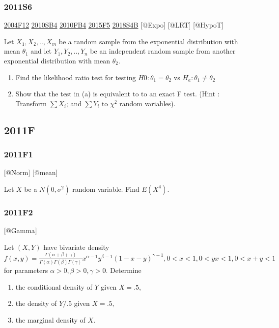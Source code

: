 \documentclass[6pt,Portrait]{article}
\begin{document}
\hypertarget{s6-2}{%
\subsubsection{2011S6}\label{s6-2}}

\protect\hyperlink{f12}{2004F12} \protect\hyperlink{sb4}{2010SB4}
\protect\hyperlink{fb4-1}{2010FB4} \protect\hyperlink{f5-5}{2015F5}
\protect\hyperlink{s4b-2}{2018S4B} {[}@Expo{]} {[}@LRT{]} {[}@HypoT{]}

Let \(X_1,X_2,..,X_{m}\) be a random sample from the exponential
distribution with mean \(\theta_1\) and let \(Y_1,Y_2,..,Y_{n}\) be an
independent random sample from another exponential distribution with
mean \(\theta_2\).

\begin{enumerate}
\def\labelenumi{(\alph{enumi})}
\item
  Find the likelihood ratio test for testing \(H0:\theta_1=\theta_2\) vs
  \(H_a:\theta_1\neq\theta_2\)
\item
  Show that the test in (a) is equivalent to to an exact F test. (Hint :
  Transform \(\sum X_i\); and \(\sum Y_i\) to \(\chi^2\) random
  variables).
\end{enumerate}

\hypertarget{f-7}{%
\subsection{2011F}\label{f-7}}

\hypertarget{f1-4}{%
\subsubsection{2011F1}\label{f1-4}}

{[}@Norm{]} {[}@mean{]}

Let \(X\) be a \(N(0,\sigma^2)\) random variable. Find \(E(X^4)\).

\hypertarget{f2-4}{%
\subsubsection{2011F2}\label{f2-4}}

{[}@Gamma{]}

Let \((X,Y)\) have bivariate density
\(f(x,y)=\frac{\Gamma(\alpha+\beta+\gamma)}{\Gamma(\alpha)\Gamma(\beta)\Gamma(\gamma)}x^{\alpha-1}y^{\beta-1}(1-x-y)^{\gamma-1},0<x<1,0<yx<1,0<x+y<1\)
for parameters \(\alpha>0,\beta>0,\gamma>0\). Determine

\begin{enumerate}
\def\labelenumi{(\alph{enumi})}
\item
  the conditional density of \(Y\) given \(X=.5\),
\item
  the density of \(Y/.5\) given \(X=.5\),
\item
  the marginal density of \(X\).
\end{enumerate}
\end{document}
